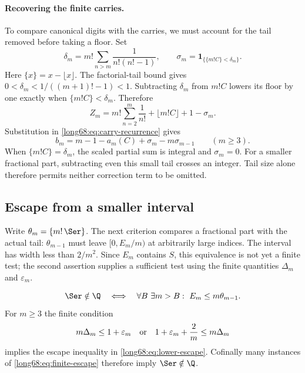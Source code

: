 \paragraph{Recovering the finite carries.}\label{long68:sec:floor-correction}
To compare canonical digits with the carries, we must account for the
tail removed before taking a floor. Set
\[
 \delta_m=m!\sum_{n>m}\frac1{n!(n!-1)},\qquad
 \sigma_m=\mathbf1_{\{\{m!C\}<\delta_m\}}.
\]
Here $\{x\}=x-\lfloor x\rfloor$. The factorial-tail bound gives
$0<\delta_m<1/((m+1)!-1)<1$. Subtracting $\delta_m$ from $m!C$
lowers its floor by one exactly when $\{m!C\}<\delta_m$. Therefore
\[
 Z_m=m!\sum_{n=2}^m\frac1{n!}+\lfloor m!C\rfloor+1-\sigma_m.
\]
Substitution in \eqref{long68:eq:carry-recurrence} gives
\begin{equation}
 b_m=m-1-a_m(C)+\sigma_m-m\sigma_{m-1}\qquad(m\ge3).
 \label{long68:eq:companion-wrap}
\end{equation}
When $\{m!C\}=\delta_m$, the scaled partial sum is integral and $\sigma_m=0$.
For a smaller fractional part, subtracting even this small tail crosses
an integer. Tail size alone therefore permits neither correction term
to be omitted.

\subsection{Escape from a smaller interval}

Write $\theta_m=\{m!\,\Ser\}$. The next criterion compares a
fractional part with the actual tail: $\theta_{m-1}$ must leave
$[0,E_m/m)$ at arbitrarily large indices. The interval has width
less than $2/m^2$. Since $E_m$ contains $S$, this equivalence is not
yet a finite test; the second assertion supplies a sufficient test
using the finite quantities $\Delta_m$ and $\varepsilon_m$.

\begin{proposition}\label{long68:res:lower-escape}
\begin{equation}\label{long68:eq:lower-escape}
 \Ser\notin\Q
 \quad\Longleftrightarrow\quad
 \forall B\ \exists m>B:\ E_m\le m\theta_{m-1}.
\end{equation}
For $m\ge3$ the finite condition
\begin{equation}\label{long68:eq:finite-escape}
 m\Delta_m\le1+\varepsilon_m
 \quad\hbox{or}\quad
 1+\varepsilon_m+\frac2m\le m\Delta_m
\end{equation}
implies the escape inequality in \eqref{long68:eq:lower-escape}.  Cofinally many
instances of \eqref{long68:eq:finite-escape} therefore imply $\Ser\notin\Q$.
\end{proposition}

